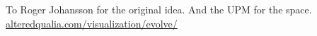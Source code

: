 To Roger Johansson for the original idea. And the UPM for the space.\\
\href{https://alteredqualia.com/visualization/evolve/}{alteredqualia.com/visualization/evolve/}

